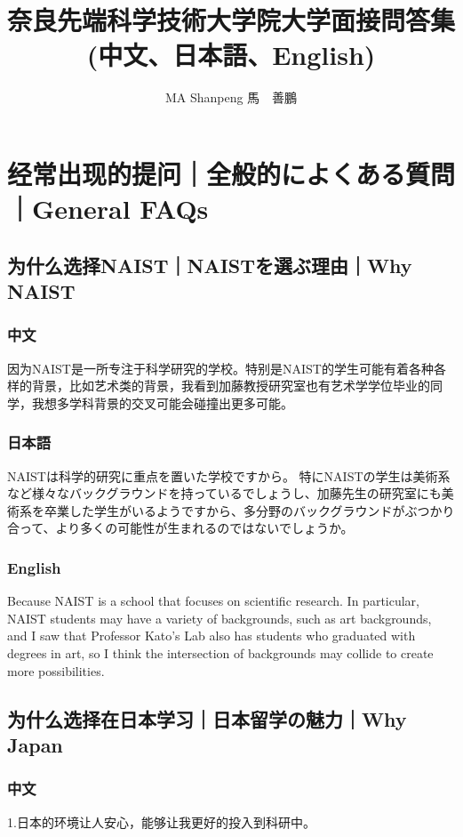 \documentclass[lang=cn,11pt,a4paper]{elegantpaper}
\title{奈良先端科学技術大学院大学面接問答集\\(中文、日本語、English)}
\author{MA Shanpeng 馬　善鵬}
\institute{\href{https://inusturbo.github.io/}{個人ホームページ}}
\date{\zhtoday}
\begin{document}
\maketitle

\begin{abstract}


\end{abstract}

 \tableofcontents

\section{经常出现的提问｜全般的によくある質問｜General FAQs}
\subsection{为什么选择NAIST｜NAISTを選ぶ理由｜Why NAIST}
\subsubsection{中文}
因为NAIST是一所专注于科学研究的学校。特别是NAIST的学生可能有着各种各样的背景，比如艺术类的背景，我看到加藤教授研究室也有艺术学学位毕业的同学，我想多学科背景的交叉可能会碰撞出更多可能。
\subsubsection{日本語}
NAISTは科学的研究に重点を置いた学校ですから。 特にNAISTの学生は美術系など様々なバックグラウンドを持っているでしょうし、加藤先生の研究室にも美術系を卒業した学生がいるようですから、多分野のバックグラウンドがぶつかり合って、より多くの可能性が生まれるのではないでしょうか。
\subsubsection{English}
Because NAIST is a school that focuses on scientific research. In particular, NAIST students may have a variety of backgrounds, such as art backgrounds, and I saw that Professor Kato's Lab also has students who graduated with degrees in art, so I think the intersection of backgrounds may collide to create more possibilities.

\subsection{为什么选择在日本学习｜日本留学の魅力｜Why Japan}
\subsubsection{中文}
1.日本的环境让人安心，能够让我更好的投入到科研中。
\end{document}
